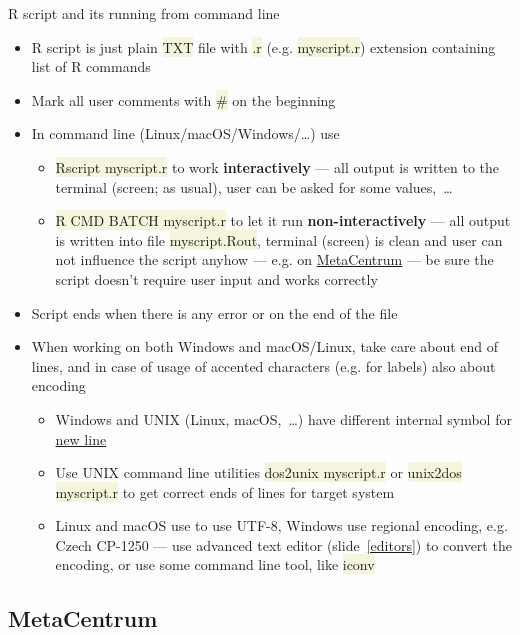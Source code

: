 \documentclass[compress, xelatex, 11pt, xcolor=svgnames, aspectratio=169, url={hyphens, lowtilde}]{beamer}
\renewcommand{\texttt}[1]{\colorbox{Beige}{{\ttfamily #1}}}
\begin{document}
\begin{frame}[allowframebreaks]{R script and its running from command line}
	\begin{itemize}
		\item R script is just plain \texttt{TXT} file with \texttt{.r} (e.g. \texttt{myscript.r}) extension containing list of R commands
		\item Mark all user comments with \texttt{\#} on the beginning
		\item In command line (Linux/macOS/Windows/\ldots) use
		\begin{itemize}
			\item \texttt{Rscript myscript.r} to work \textbf{interactively} --- all output is written to the terminal (screen; as usual), user can be asked for some values,~\ldots
			\item \texttt{R CMD BATCH myscript.r} to let it run \textbf{non-interactively} --- all output is written into file \texttt{myscript.Rout}, terminal (screen) is clean and user can not influence the script anyhow --- e.g. on \href{https://www.metacentrum.cz/}{MetaCentrum} --- be sure the script doesn't require user input and works correctly
		\end{itemize}
		\item Script ends when there is any error or on the end of the file
		\item When working on both Windows and macOS/Linux, take care about end of lines, and in case of usage of accented characters (e.g. for labels) also about encoding
		\begin{itemize}
			\item Windows and UNIX (Linux, macOS,~\ldots) have different internal symbol for \href{https://en.wikipedia.org/wiki/Newline}{new line}
			\item Use UNIX command line utilities \texttt{dos2unix myscript.r} or \texttt{unix2dos myscript.r} to get correct ends of lines for target system
			\item Linux and macOS use to use UTF-8, Windows use regional encoding, e.g. Czech CP-1250 --- use advanced text editor (slide~\ref{editors}) to convert the encoding, or use some command line tool, like \texttt{iconv}
		\end{itemize}
	\end{itemize}
\end{frame}

\subsection{MetaCentrum}
\end{document}
